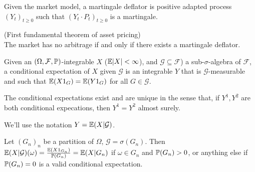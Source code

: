 \documentclass[a4paper]{article}
\begin{document}
\begin{defi}
Given the market model, a martingale deflator is positive adapted process $(Y_t)_{t \geq 0}$ such that $(Y_t \cdot P_t)_{t \geq 0}$ is a martingale.
\end{defi}

\begin{thm} (First fundamental theorem of asset pricing)\\
The market has no arbitrage if and only if there exists a martingale deflator.
\end{thm}

\begin{defi}
Given an $(\Omega,\mathcal{F},\P)$-integrable $X$ ($\E|X| < \infty$), and $\mathcal{G} \subseteq \mathcal{F}$) a sub-$\sigma$-algebra of $\mathcal{F}$, a conditional expectation of $X$ given $\mathcal{G}$ is an integrable $Y$ that is $\mathcal{G}$-measurable and such that $\E(X 1_G) = \E(Y 1_G)$ for all $G \in \mathcal{G}$.
\end{defi}

\begin{thm}
The conditional expectations exist and are unique in the sense that, if $Y^1,Y^2$ are both conditional expecations, then $Y^1=Y^2$ almost surely.
\end{thm}

We'll use the notation $Y = \E(X|\mathcal{G})$.

\begin{eg}
Let $(G_n)_n$ be a partition of $\Omega$, $\mathcal{G} = \sigma({G_n})$. Then $\E(X|\mathcal{G})(\omega) = \frac{\E(X1_{G_n})}{\P(G_n)} = \E(X|G_n)$ if $\omega \in G_n$ and $\P(G_n)>0$, or anything else if $\P(G_n) = 0$ is a valid conditional expectation.
\end{eg}
\end{document}
